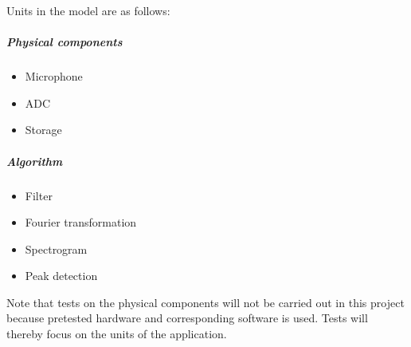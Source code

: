 Units in the model are as follows:
\begin{multicols}{2}
\subparagraph{Physical components}  
\begin{itemize}
	\item Microphone
	\item ADC
	\item Storage
\end{itemize}
\columnbreak
\subparagraph{Algorithm}
\begin{itemize}
	\item Filter
	\item Fourier transformation
	\item Spectrogram
	\item Peak detection
\end{itemize}
\end{multicols}
Note that tests on the physical components will not be carried out in this project because pretested hardware and corresponding software is used. Tests will thereby focus on the units of the application.
 
